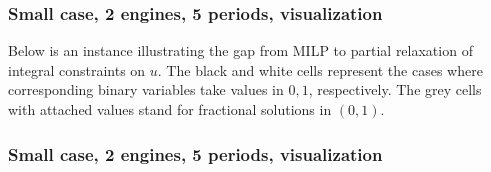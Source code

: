 
\begin{frame}
  \frametitle{Small case, 2 engines, 5 periods, visualization}
  Below is an instance illustrating the gap from MILP to partial relaxation of integral constraints on \(u\).
  The black and white cells represent the cases where corresponding binary variables take values in \(0, 1\), respectively.
  The grey cells with attached values stand for fractional solutions in \((0, 1)\).

\end{frame}
\begin{frame}
  \frametitle{Small case, 2 engines, 5 periods, visualization}

  \begin{figure}
  \end{figure}
\end{frame}
